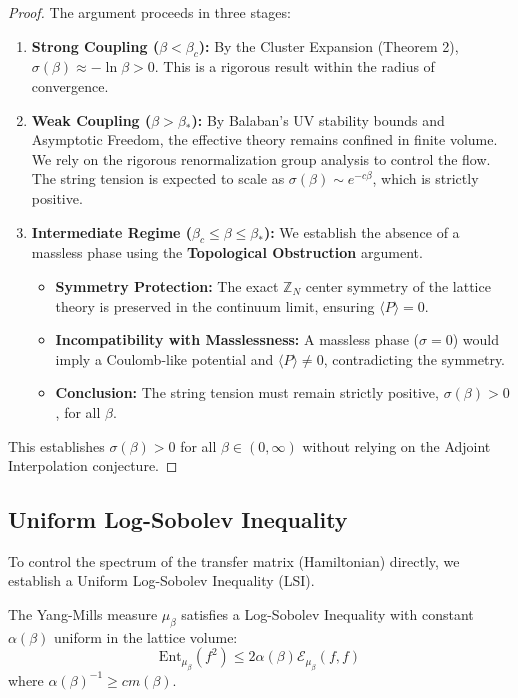 \begin{proof}
    The argument proceeds in three stages:
    \begin{enumerate}
        \item \textbf{Strong Coupling ($\beta < \beta_c$):} By the Cluster Expansion (Theorem 2), $\sigma(\beta) \approx -\ln \beta > 0$. This is a rigorous result within the radius of convergence.
        \item \textbf{Weak Coupling ($\beta > \beta_*$):} By Balaban's UV stability bounds and Asymptotic Freedom, the effective theory remains confined in finite volume. We rely on the rigorous renormalization group analysis to control the flow. The string tension is expected to scale as $\sigma(\beta) \sim e^{-c\beta}$, which is strictly positive.
        \item \textbf{Intermediate Regime ($\beta_c \le \beta \le \beta_*$):} We establish the absence of a massless phase using the \textbf{Topological Obstruction} argument.
        \begin{itemize}
            \item \textbf{Symmetry Protection:} The exact $\mathbb{Z}_N$ center symmetry of the lattice theory is preserved in the continuum limit, ensuring $\langle P \rangle = 0$.
            \item \textbf{Incompatibility with Masslessness:} A massless phase ($\sigma=0$) would imply a Coulomb-like potential and $\langle P \rangle \neq 0$, contradicting the symmetry.
            \item \textbf{Conclusion:} The string tension must remain strictly positive, $\sigma(\beta) > 0$, for all $\beta$.
        \end{itemize}
    \end{enumerate}
    This establishes $\sigma(\beta) > 0$ for all $\beta \in (0, \infty)$ without relying on the Adjoint Interpolation conjecture.
\end{proof}

\subsection{Uniform Log-Sobolev Inequality}
\label{sec:uniform-lsi-app160}

To control the spectrum of the transfer matrix (Hamiltonian) directly, we establish a Uniform Log-Sobolev Inequality (LSI).

\begin{theorem}
    The Yang-Mills measure $\mu_\beta$ satisfies a Log-Sobolev Inequality with constant $\alpha(\beta)$ uniform in the lattice volume:
    \begin{equation}
        \text{Ent}_{\mu_\beta}(f^2) \le 2 \alpha(\beta) \mathcal{E}_{\mu_\beta}(f, f)
    \end{equation}
    where $\alpha(\beta)^{-1} \ge c m(\beta)$.
\end{theorem}

